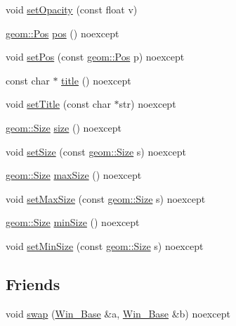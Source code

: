 \begin{DoxyCompactItemize}
\item 
void \mbox{\hyperlink{classrolmodl_1_1_win___base_a2058f1eed4ad2348c45033ec0ff3c68d}{set\+Opacity}} (const float v)
\item 
\mbox{\hyperlink{structrolmodl_1_1geom_1_1_pos}{geom\+::\+Pos}} \mbox{\hyperlink{classrolmodl_1_1_win___base_af0813dd30c002b32f0ab9218059dba55}{pos}} () noexcept
\item 
void \mbox{\hyperlink{classrolmodl_1_1_win___base_a157c6195fb7dd41b6e5535777b5b7046}{set\+Pos}} (const \mbox{\hyperlink{structrolmodl_1_1geom_1_1_pos}{geom\+::\+Pos}} p) noexcept
\item 
const char $\ast$ \mbox{\hyperlink{classrolmodl_1_1_win___base_abc249a06cd285e302175c0371ed2564a}{title}} () noexcept
\item 
void \mbox{\hyperlink{classrolmodl_1_1_win___base_a2df336b4c6994db0a40fd96629e0f3af}{set\+Title}} (const char $\ast$str) noexcept
\item 
\mbox{\hyperlink{structrolmodl_1_1geom_1_1_size}{geom\+::\+Size}} \mbox{\hyperlink{classrolmodl_1_1_win___base_aa9e0fe7017cafd9a89e18d4676ff6c00}{size}} () noexcept
\item 
void \mbox{\hyperlink{classrolmodl_1_1_win___base_ad492295ad89ac5f8eef7f9e70b3b3afd}{set\+Size}} (const \mbox{\hyperlink{structrolmodl_1_1geom_1_1_size}{geom\+::\+Size}} s) noexcept
\item 
\mbox{\hyperlink{structrolmodl_1_1geom_1_1_size}{geom\+::\+Size}} \mbox{\hyperlink{classrolmodl_1_1_win___base_a58bff9f425da4b15e829f65214a6b993}{max\+Size}} () noexcept
\item 
void \mbox{\hyperlink{classrolmodl_1_1_win___base_a3e7388e8d6be96159334eecca325749c}{set\+Max\+Size}} (const \mbox{\hyperlink{structrolmodl_1_1geom_1_1_size}{geom\+::\+Size}} s) noexcept
\item 
\mbox{\hyperlink{structrolmodl_1_1geom_1_1_size}{geom\+::\+Size}} \mbox{\hyperlink{classrolmodl_1_1_win___base_a661e48095b9161730e671de838e1f18a}{min\+Size}} () noexcept
\item 
void \mbox{\hyperlink{classrolmodl_1_1_win___base_a9a8e417ba5b7f943305eba48dc591a4b}{set\+Min\+Size}} (const \mbox{\hyperlink{structrolmodl_1_1geom_1_1_size}{geom\+::\+Size}} s) noexcept
\end{DoxyCompactItemize}
\subsection*{Friends}
\begin{DoxyCompactItemize}
\item 
void \mbox{\hyperlink{classrolmodl_1_1_win___base_a4f8fa1bc42c64d1dddf12ffc78041465}{swap}} (\mbox{\hyperlink{classrolmodl_1_1_win___base}{Win\+\_\+\+Base}} \&a, \mbox{\hyperlink{classrolmodl_1_1_win___base}{Win\+\_\+\+Base}} \&b) noexcept
\end{DoxyCompactItemize}


